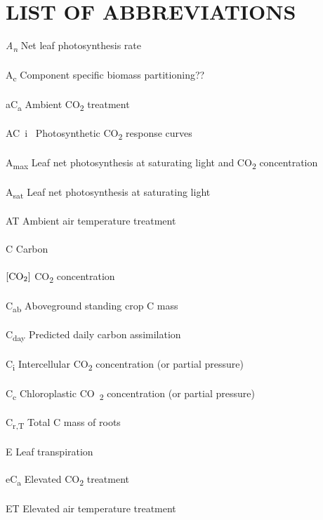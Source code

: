 \documentclass[a4paper]{article}\usepackage[]{graphicx}\usepackage[]{color}
\begin{document}
\section*{LIST OF ABBREVIATIONS}

\textit{A\textsubscript{n}}  Net leaf photosynthesis rate
\\
\\
A\textsubscript{c} Component specific biomass partitioning??
\\
\\
aC\textsubscript{a} Ambient CO\textsubscript{2} treatment
\\
\\
AC~i~ Photosynthetic CO\textsubscript{2} response curves 
\\
\\
A\textsubscript{max} Leaf net photosynthesis at saturating light and CO\textsubscript{2} concentration
\\
\\
A\textsubscript{sat} Leaf net photosynthesis at saturating light
\\
\\
AT  Ambient air temperature treatment
\\
\\
C Carbon
\\
\\
$[\textrm{CO\textsubscript{2}}]$ CO\textsubscript{2} concentration
\\
\\
C\textsubscript{ab} Aboveground standing crop C mass
\\
\\
C\textsubscript{day} Predicted daily carbon assimilation
\\
\\
C\textsubscript{i} Intercellular CO\textsubscript{2} concentration (or partial pressure)
\\
\\
C\textsubscript{c} Chloroplastic CO~\textsubscript{2} concentration (or partial pressure)
\\
\\
C\textsubscript{r,T}  Total C mass of roots
\\
\\
E Leaf transpiration
\\
\\
eC\textsubscript{a} Elevated CO\textsubscript{2} treatment
\\
\\
ET  Elevated air temperature treatment
\\
\end{document}
